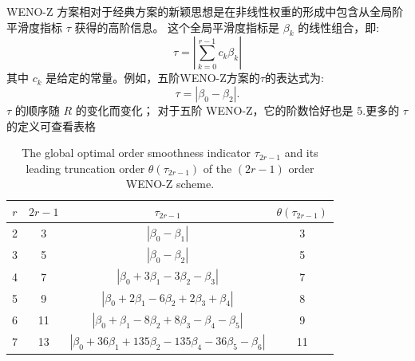 \documentclass{book}
\begin{document}
\begin{example}
\begin{example}{}{}
\begin{example}
\begin{example}
\begin{example}
WENO-Z 方案相对于经典方案的新颖思想是在非线性权重的形成中包含从全局阶平滑度指标 $\tau$ 获得的高阶信息。 这个全局平滑度指标是 $\beta_{k}$ 的线性组合，即:
\begin{equation}
    \tau=\left|\sum_{k=0}^{r-1} c_{k} \beta_{k}\right|
\end{equation}
其中 $c_{k}$ 是给定的常量。例如，五阶WENO-Z方案的$\tau$的表达式为:
\begin{equation}
    \tau=\left|\beta_{0}-\beta_{2}\right| .
\end{equation}
$\tau$ 的顺序随 $R$ 的变化而变化； 对于五阶 WENO-Z，它的阶数恰好也是 5.更多的 $\tau$ 的定义可查看表格\cite{WENO-Z-2013}
\begin{table}[htbp]
    \centering
    \label{table:tau_ref}
    \caption{The global optimal order smoothness indicator  $\tau_{2 r-1}$  and its leading truncation order  $\theta\left(\tau_{2 r-1}\right)$  of the  $(2 r-1)$  order WENO-Z scheme.}
    \begin{tabular}{cccc}
        \toprule
        $r$ & $2r-1$ & $\tau_{2r-1}$                                                 & $\theta(\tau_{2r-1})$ \\
        \midrule
        2   & 3      & $|\beta_0-\beta_1|$                                           & 3                     \\
        3   & 5      & $|\beta_0-\beta_2|$                                           & 5                     \\
        4   & 7      & $|\beta_0+3\beta_1-3\beta_2-\beta_3|$                         & 7                     \\
        5   & 9      & $|\beta_0+2\beta_1-6\beta_2+2\beta_3+\beta_4|$                & 8                     \\
        6   & 11     & $|\beta_0+\beta_1-8\beta_2+8\beta_3-\beta_4-\beta_5|$         & 9                     \\
        7   & 13     & $|\beta_0+36\beta_1+135\beta_2-135\beta_4-36\beta_5-\beta_6|$ & 11                    \\
        \bottomrule
    \end{tabular}
\end{table}


\end{example}
\end{example}
\end{example}
\end{example}
\end{example}
\end{document}

